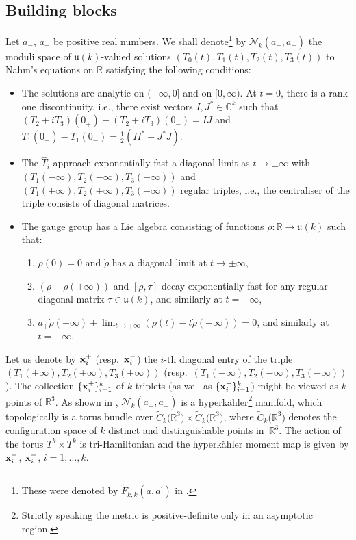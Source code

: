 \documentclass[10pt,a4paper]{amsart}
\renewcommand{\u}{{\mathfrak u}}
\numberwithin{equation}{section}
\newcommand{\oC}{{\mathbb{C}}}
\newcommand{\oR}{{\mathbb{R}}}
\newcommand{\sN}{{\mathcal{N}}}
\begin{document}
{\subsection{Building blocks}
Let $a_-$, $a_+$ be positive real numbers. We shall denote\footnote{These were denoted by $\tilde F_{k,k}(a,a^\prime)$ in \cite{BSU}.} by $\sN_k(a_-,a_+)$ the moduli space of $\u(k)$-valued solutions {$(T_0(t),T_1(t),T_2(t),T_3(t))$} to Nahm's equations on $\oR$ satisfying the following conditions:
 \begin{itemize}\itemsep=0pt
 \item The solutions are analytic on $(-\infty, 0]$ and on $[0,\infty)$. At $t=0$, there is a rank one discontinuity, i.e., there exist vectors $I,J^\ast \in\oC^k$ such that $(T_2+i T_3)(0_+)-(T_2+i T_3)(0_-)=IJ$
and $T_1(0_+)-T_1(0_-)=\frac{1}{2}(II^\ast-J^\ast J).$
 	\item The $\hat{T}_i$ approach exponentially fast a diagonal limit as $t\rightarrow \pm\infty$ with $(T_1(-\infty),T_2(-\infty),\allowbreak T_3(-\infty))$ and $(T_1(+\infty),T_2(+\infty), T_3(+\infty))$ regular triples, i.e., the centraliser of the triple consists of diagonal matrices.
 	\item The gauge group has a Lie algebra consisting of functions $\rho\colon \oR\rightarrow\mathfrak{u}(k)$ such that:
 	\begin{enumerate}\itemsep=0pt
 		\item[(1)] $\rho(0)=0$ and $\dot{\rho}$ has a diagonal limit at $t\rightarrow \pm\infty$,
 		\item[(2)] $(\dot{\rho}-\dot{\rho}(+\infty))$ and $[\rho,\tau]$ decay exponentially fast for any regular diagonal matrix $\tau\in\mathfrak{u}(k)$, and similarly at $t=-\infty$,
 		\item[(3)] $a_+\dot{\rho}(+\infty)+\lim_{t\rightarrow +\infty}(\rho(t)-t\dot{\rho}(+\infty))=0$,
 		and similarly at $t=-\infty$.
 	\end{enumerate}
 \end{itemize}
 Let us denote by ${\bf x}^+_i$ (resp.~${\bf x}^-_i$) the $i$-th diagonal entry of the triple {$(T_1(+\infty),\allowbreak T_2(+\infty),\allowbreak T_3(+\infty))$} (resp.~$(T_1(-\infty),T_2(-\infty),T_3(-\infty))$).
The collection $\{{\bf x}_i^+\}_{i=1}^k$ of $k$ triplets (as well as $\{{\bf x}_i^-\}_{i=1}^k$)
might be viewed as $k$ points of $\oR^3$.
 As shown in \cite{BSU}, $\sN_k(a_-,a_+)$ is a hyperk\"ahler\footnote{Strictly speaking the metric is positive-definite only in an asymptotic region.} manifold, which topologically is a torus bundle over $\tilde C_k\big(\oR^3\big)\times \tilde C_k\big(\oR^3\big) $, where $\tilde C_k\big(\oR^3\big)$ denotes the configuration space of $k$ distinct and distinguishable points in~$\oR^3$. The action of the torus $T^k\times T^k$ is tri-Hamiltonian and the hyperk\"ahler moment map is given by ${\bf x}^-_i$, ${\bf x}^+_i$, $i=1,\dots,k$.
}
\end{document}
